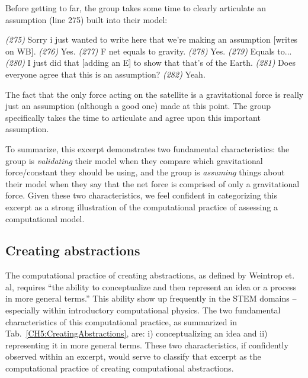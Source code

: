 \documentclass{msuphddissertation}
\begin{document}
\begin{doublespace}
Before getting to far, the group takes some time to clearly articulate an assumption (line 275) built into their model:
\begin{description}
\SA \textit{(275)} Sorry i just wanted to write here that we're making an assumption [writes on WB].
\SD \textit{(276)} Yes.
\SD \textit{(277)} F net equals to gravity.
\SD \textit{(278)} Yes.
\SD \textit{(279)} Equals to...
\SA \textit{(280)} I just did that [adding an E] to show that that's of the Earth.
\SA \textit{(281)} Does everyone agree that this is an assumption?	
\SC \textit{(282)} Yeah.
\end{description}  The fact that the only force acting on the satellite is a gravitational force is really just an assumption (although a good one) made at this point.  The group specifically takes the time to articulate and agree upon this important assumption.

To summarize, this excerpt demonstrates two fundamental characteristics: the group is \textit{validating} their model when they compare which gravitational force/constant they should be using, and the group is \textit{assuming} things about their model when they say that the net force is comprised of only a gravitational force.  Given these two characteristics, we feel confident in categorizing this excerpt as a strong illustration of the computational practice of assessing a computational model.

%
%
%
%
%
%
%
%
%
%
%
%
%
%
%
%

\subsection{Creating abstractions}

The computational practice of creating abstractions, as defined by Weintrop et. al, requires ``the ability to conceptualize and then represent an idea or a process in more general terms.''  This ability show up frequently in the STEM domains -- especially within introductory computational physics.  The two fundamental characteristics of this computational practice, as summarized in Tab.~\ref{CH5:CreatingAbstractions}, are: i) conceptualizing an idea and ii) representing it in more general terms.  These two characteristics, if confidently observed within an excerpt, would serve to classify that excerpt as the computational practice of creating computational abstractions.


\end{doublespace}
\end{document}
